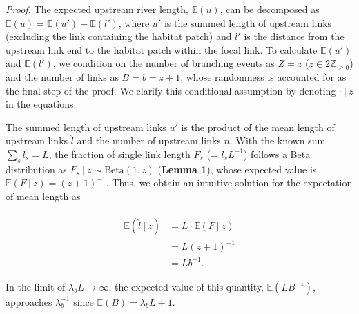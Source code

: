 \documentclass[11pt, class=article, crop=false]{standalone}
\begin{document}
\textit{Proof.}
The expected upstream river length, $\mathbb{E}(u)$, can be decomposed as $\mathbb{E}(u) = \mathbb{E}(u') + \mathbb{E}(l')$, where $u'$ is the summed length of upstream links (excluding the link containing the habitat patch) and $l'$ is the distance from the upstream link end to the habitat patch within the focal link.
To calculate $\mathbb{E}(u')$ and $\mathbb{E}(l')$, we condition on the number of branching events as $Z = z$ ($z \in 2\mathbb{Z}_{\ge 0}$) and the number of links as $B = b = z + 1$, whose randomness is accounted for as the final step of the proof.
We clarify this conditional assumption by denoting $\cdot ~|~ z$ in the equations.

The summed length of upstream links $u'$ is the product of the mean length of upstream links $\hat{l}$ and the number of upstream links $n$.
With the known sum $\sum_s l_s = L$, the fraction of single link length $F_s$ (= $l_s L^{-1}$) follows a Beta distribution as $F_s ~|~ z \sim \mbox{Beta}(1, z)$ (\textbf{Lemma 1}), whose expected value is $\mathbb{E}(F~|~z) = (z + 1)^{-1}$.
Thus, we obtain an intuitive solution for the expectation of mean length as

\begin{align}
    \begin{split}
    \mathbb{E}(\hat{l}~|~z) &= L \cdot \mathbb{E}(F~|~z)\\
                            &= L(z + 1)^{-1}\\
                            &= Lb^{-1}.
    \end{split}
\end{align}

In the limit of $\lambda_b L \rightarrow \infty$, the expected value of this quantity, $\mathbb{E}(LB^{-1})$, approaches $\lambda_b^{-1}$ since $\mathbb{E}(B) = \lambda_b L + 1$.
\end{document}
